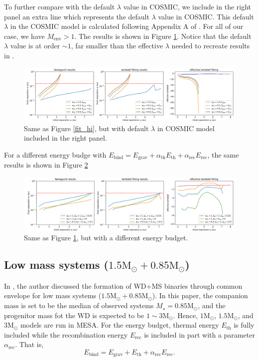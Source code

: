 \documentclass[12pt]{article}
\newcommand{\Msun}{\mathrm{M_{\odot}}}
\newcommand{\Mstar}{M_{\star}}
\newcommand{\alphath}{\alpha_{\mathrm{th}}}
\newcommand{\alpharec}{\alpha_{\mathrm{rec}}}
\newcommand{\Ebind}{E_{\mathrm{bind}}}
\newcommand{\Egrav}{E_{\mathrm{grav}}}
\newcommand{\Eth}{E_{\mathrm{th}}}
\newcommand{\Erec}{E_{\mathrm{rec}}}
\begin{document}
To further compare with the default $\lambda$ value in COSMIC, we include in the right panel an extra line which represents the default $\lambda$ value in COSMIC. This default $\lambda$ in the COSMIC model is calculated following Appendix A of \cite{claeys2014theoretical}. For all of our case, we have $M_{\mathrm{env}} > 1$. The results is shown in Figure \ref{fit_cmp_hi}. Notice that the default $\lambda$ value is at order $\sim 1$, far smaller than the effective $\lambda$ needed to recreate results in \cite{yamaguchi_hi}.

\begin{figure}
    \centering
    \includegraphics[width=\linewidth]{7+1cmp.png}
    \caption{Same as Figure \ref{fit_hi}, but with default $\lambda$ in COSMIC model included in the right panel.}
    \label{fit_cmp_hi}
\end{figure}

For a different energy budge with $\Ebind = \Egrav + \alphath \Eth + \alpharec \Erec$, the same results is shown in Figure \ref{fit_cmp_eb_hi}

\begin{figure}
    \centering
    \includegraphics[width=\linewidth]{7+1ebcmp.png}
    \caption{Same as Figure \ref{fit_cmp_hi}, but with a different energy budget.}
    \label{fit_cmp_eb_hi}
\end{figure}


\subsection{Low mass systems ($1.5\Msun + 0.85\Msun$)}

In \cite{yamaguchi_lo}, the author discussed the formation of WD+MS binaries through common envelope for low mass systems ($1.5\Msun + 0.85\Msun$). In this paper, the companion mass is set to be the median of observed systems $\Mstar = 0.85\Msun$, and the progenitor mass fot the WD is expected to be $1 \sim 3 \Msun$. Hence, $1\Msun$, $1.5\Msun$, and $3\Msun$ models are run in MESA. For the energy budget, thermal energy $\Eth$ is fully included while the recombination energy $\Erec$ is included in part with a parameter $\alpharec$. That is,
\[
    \Ebind = \Egrav + \Eth + \alpharec \Erec.
\]
 
\end{document}
